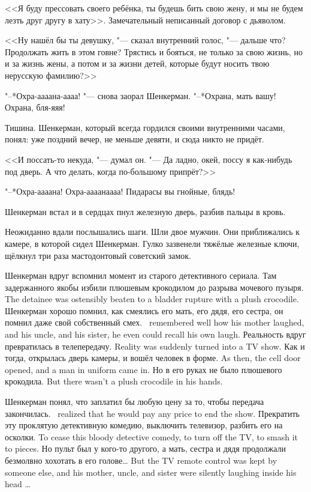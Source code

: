 <<Я буду прессовать своего ребёнка, ты будешь бить свою жену, и мы не будем лезть друг другу в хату>>.
Замечательный неписанный договор с дьяволом.

<<Ну нашёл бы ты девушку, "--- сказал внутренний голос, "--- дальше что?
Продолжать жить в этом говне?
Трястись и бояться, не только за свою жизнь, но и за жизнь жены, а потом и за жизни детей, которые будут носить твою нерусскую фамилию?>>

"--*Охра-аааана-аааа! "--- снова заорал Шенкерман.
"--*Охрана, мать вашу!
Охрана, бля-яяя!

Тишина.
Шенкерман, который всегда гордился своими внутренними часами, понял: уже поздний вечер, не меньше девяти, и сюда никто не придёт.

<<И поссать-то некуда, "--- думал он.
"--- Да ладно, окей, поссу я как-нибудь под дверь.
А что делать, когда по-большому припрёт?>>

"--*Охра-аааана!
Охра-аааанаааа!
Пидарасы вы гнойные, блядь!

Шенкерман встал и в сердцах пнул железную дверь, разбив пальцы в кровь.

Неожиданно вдали послышались шаги.
Шли двое мужчин.
Они приближались к камере, в которой сидел Шенкерман.
Гулко зазвенели тяжёлые железные ключи, щёлкнул три раза мастодонтовый советский замок.

Шенкерман вдруг вспомнил момент из старого детективного сериала.
{Там задержанного якобы избили плюшевым крокодилом до разрыва мочевого пузыря.}
{The detainee was ostensibly beaten to a bladder rupture with a plush crocodile.}
{Шенкерман хорошо помнил, как смеялись его мать, его дядя, его сестра, он помнил даже свой собственный смех.}
{\Shenkerman\ remembered well how his mother laughed, and his uncle, and his sister, he even could recall his own laugh.}
{Реальность вдруг превратилась в телепередачу.}
{Reality was suddenly turned into a TV show.}
{Как и тогда, открылась дверь камеры, и вошёл человек в форме.}
{As then, the cell door opened, and a man in uniform came in.}
{Но в его руках не было плюшевого крокодила.}
{But there wasn't a plush crocodile in his hands.}

{Шенкерман понял, что заплатил бы любую цену за то, чтобы передача закончилась.}
{\Shenkerman\ realized that he would pay any price to end the show.}
{Прекратить эту проклятую детективную комедию, выключить телевизор, разбить его на осколки.}
{To cease this bloody detective comedy, to turn off the TV, to smash it to pieces.}
{Но пульт был у кого-то другого, а мать, сестра и дядя продолжали безмолвно хохотать в его голове\ldots{}}
{But the TV remote control was kept by someone else, and his mother, uncle, and sister were silently laughing inside his head \ldots{}}

